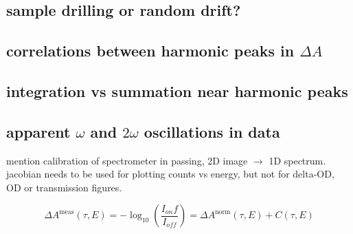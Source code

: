\subsection{sample drilling or random drift?}
\subsection{correlations between harmonic peaks in $\Delta A$}
\subsection{integration vs summation near harmonic peaks}
\subsection{apparent $\omega$ and $2\omega$ oscillations in data}



mention calibration of spectrometer in passing, 2D image $\rightarrow$ 1D spectrum. jacobian needs to be used for plotting counts vs energy, but not for delta-OD, OD or transmission figures.

\begin{equation}
\Delta A^{\text{meas}}(\tau, E) = -\log_{10} \left( \frac{I_{on} f}{I_{off}} \right) = \Delta A^{\text{norm}}(\tau,E) + C(\tau,E)
\label{eqn:deltaA_linear_correction}
\end{equation}
